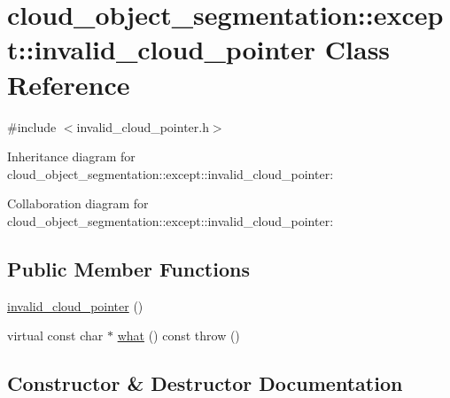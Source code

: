 \hypertarget{classcloud__object__segmentation_1_1except_1_1invalid__cloud__pointer}{}\section{cloud\+\_\+object\+\_\+segmentation\+:\+:except\+:\+:invalid\+\_\+cloud\+\_\+pointer Class Reference}
\label{classcloud__object__segmentation_1_1except_1_1invalid__cloud__pointer}


{\ttfamily \#include $<$invalid\+\_\+cloud\+\_\+pointer.\+h$>$}



Inheritance diagram for cloud\+\_\+object\+\_\+segmentation\+:\+:except\+:\+:invalid\+\_\+cloud\+\_\+pointer\+:


Collaboration diagram for cloud\+\_\+object\+\_\+segmentation\+:\+:except\+:\+:invalid\+\_\+cloud\+\_\+pointer\+:
\subsection*{Public Member Functions}
\begin{DoxyCompactItemize}
\item 
\hyperlink{classcloud__object__segmentation_1_1except_1_1invalid__cloud__pointer_a53bec2ca8e4e7fad7eec4ebd5159af1f}{invalid\+\_\+cloud\+\_\+pointer} ()
\item 
virtual const char $\ast$ \hyperlink{classcloud__object__segmentation_1_1except_1_1invalid__cloud__pointer_a96111977a8f344133f3f9ddf428c2489}{what} () const   throw ()
\end{DoxyCompactItemize}


\subsection{Constructor \& Destructor Documentation}
